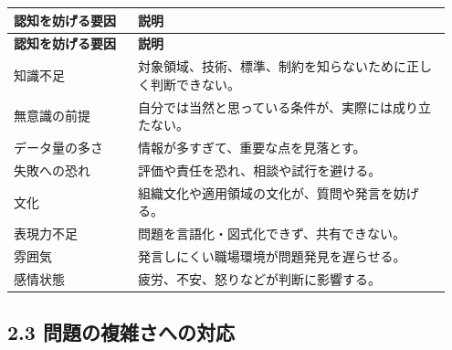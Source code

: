 \documentclass[uplatex,dvipdfmx,a4paper,11pt]{jsarticle}
\begin{document}
\begin{center}
\small
\begin{longtable}{p{0.27\linewidth}p{0.68\linewidth}}
\toprule
\textbf{認知を妨げる要因} & \textbf{説明} \\
\midrule
\endfirsthead
\toprule
\textbf{認知を妨げる要因} & \textbf{説明} \\
\midrule
\endhead
知識不足 & 対象領域、技術、標準、制約を知らないために正しく判断できない。 \\
\midrule
無意識の前提 & 自分では当然と思っている条件が、実際には成り立たない。 \\
\midrule
データ量の多さ & 情報が多すぎて、重要な点を見落とす。 \\
\midrule
失敗への恐れ & 評価や責任を恐れ、相談や試行を避ける。 \\
\midrule
文化 & 組織文化や適用領域の文化が、質問や発言を妨げる。 \\
\midrule
表現力不足 & 問題を言語化・図式化できず、共有できない。 \\
\midrule
雰囲気 & 発言しにくい職場環境が問題発見を遅らせる。 \\
\midrule
感情状態 & 疲労、不安、怒りなどが判断に影響する。 \\
\midrule
\bottomrule
\end{longtable}
\normalsize
\end{center}

\begin{center}
\end{center}

\begin{center}
\end{center}

\subsection*{2.3 問題の複雑さへの対応}
\end{document}
